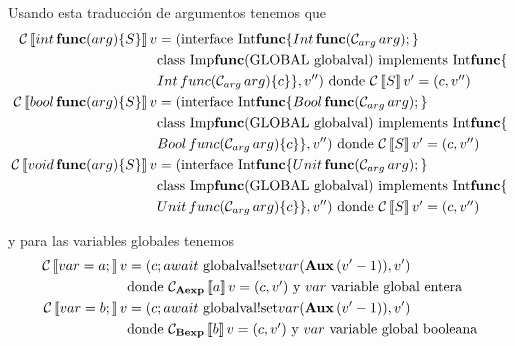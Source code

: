 Usando esta traducción de argumentos tenemos que
\begin{align*}
  \mathcal{C}\left\llbracket int\,\textbf{func}(arg)\{S\} \right\rrbracket v &= (\mbox{interface Int$\textbf{func}$}\{
  \mbox{$Int\, \textbf{func}(\mathcal{C}_{arg}\,arg)\mbox{;\,}$}\}\\
  & \mbox{class Imp$\textbf{func}($GLOBAL globalval$)$ implements Int$\textbf{func}\{$}\\
  & Int\, func(\mathcal{C}_{arg}\,arg) \{ c \}\} , v'')
  \mbox{ donde $\mathcal{C}\left\llbracket S \right\rrbracket v' = (c, v'')$} \\
  \mathcal{C}\left\llbracket bool\,\textbf{func}(arg)\{S\} \right\rrbracket v &= (\mbox{interface Int$\textbf{func}$}\{
  \mbox{$Bool\, \textbf{func}(\mathcal{C}_{arg}\,arg)\mbox{;\,}$}\}\\
  & \mbox{class Imp$\textbf{func}($GLOBAL globalval$)$ implements Int$\textbf{func}\{$}\\
  & Bool\, func(\mathcal{C}_{arg}\,arg) \{ c \}\} , v'')
  \mbox{ donde $\mathcal{C}\left\llbracket S \right\rrbracket v' = (c, v'')$} \\
  \mathcal{C}\left\llbracket void\,\textbf{func}(arg)\{S\} \right\rrbracket v &= (\mbox{interface Int$\textbf{func}$}\{
  \mbox{$Unit\, \textbf{func}(\mathcal{C}_{arg}\,arg)\mbox{;\,}$}\}\\
  & \mbox{class Imp$\textbf{func}($GLOBAL globalval$)$ implements Int$\textbf{func}\{$}\\
  & Unit\, func(\mathcal{C}_{arg}\,arg) \{ c \}\} , v'')
  \mbox{ donde $\mathcal{C}\left\llbracket S \right\rrbracket v' = (c, v'')$}
\end{align*}

y para las variables globales tenemos
\begin{align*} %
  \C\eval{var = a\;} v &= (c\; await \mbox{ globalval!set}var(\Aux\, (v' - 1)), v') \\
  & \mbox{donde $\C_\AExp\eval{a} v = (c, v')$ y $var$ variable global entera} \\
  \C\eval{var = b\;} v &= (c\; await \mbox{ globalval!set}var(\Aux\, (v' - 1)), v') \\
  & \mbox{donde $\C_\BExp\eval{b} v = (c, v')$ y $var$ variable global booleana}
\end{align*}
